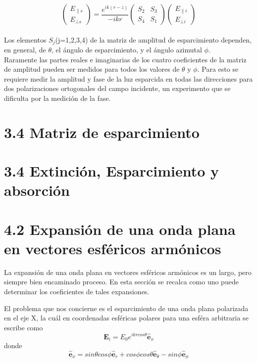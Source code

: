 \documentclass[graybox]{svmult}
\begin{document}
\begin{equation*}
\begin{pmatrix} 
E_{\parallel s}  \\
E_{\bot s}  
\end{pmatrix}
= \frac{e^{ik(r-z)}}{-ikr}
\begin{pmatrix}
S_{2} & S_{3} \\
S_{4} & S_{1}
\end{pmatrix}
\begin{pmatrix}
E_{\parallel i} \\
E_{\bot i} 
\end{pmatrix}
\end{equation*}
\\
Los elementos $S_{j}$(j=1,2,3,4) de la matriz de amplitud de esparcimiento dependen, en general, de $\theta$, el ángulo de esparcimiento, y el ángulo azimutal $\phi$.
\\
Raramente las partes reales e imaginarias de los cuatro coeficientes de la matriz  de amplitud pueden ser medidos para todos los valores de $\theta$ y $\phi$. Para esto se requiere medir la amplitud y fase de la luz esparcida en todas las direcciones para dos polarizaciones ortogonales del campo incidente, un experimento que se dificulta por la medición de la fase.



\section*{3.4 Matriz de esparcimiento}
\label{sec:3}

\section*{3.4 Extinción, Esparcimiento y absorción}
\label{sec:4}

\section*{4.2 Expansión de una onda plana en vectores esféricos armónicos}
La expansión de una onda plana en vectores esféricos armónicos es un largo, pero siempre bien encaminado proceso. En esta sección se recalca como uno puede determinar los coeficientes de tales expansiones.

El problema que nos concierne es el esparcimiento de una onda plana polarizada en el eje X, la cuál en coordenadas esféricas polares para una esféra arbitraria se escribe como
\begin{equation}
    \textbf{E}_{i} = E_{0}e^{ikrcos\theta}\hat{\textbf{e}}_{x}
\end{equation}
donde
\begin{equation}
   \hat{\textbf{e}}_{x}= sin\theta cos\phi\hat{\textbf{e}}_{r}+cos\phi cos\theta \hat{\textbf{e}}_{\theta}-sin\phi \hat{\textbf{e}}_{\phi}
\end{equation}
\end{document}
